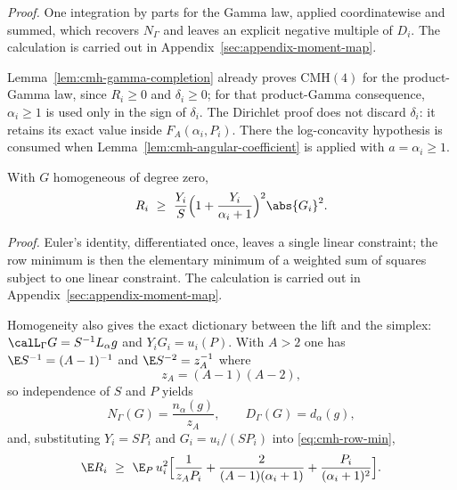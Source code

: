 \documentclass[../../main.tex]{subfiles}
\begin{document}
\noindent\emph{Proof.} One integration by parts for the Gamma law, applied coordinatewise and summed, which recovers $N_\Gamma$ and leaves an explicit negative multiple of $D_i$. The calculation is carried out in Appendix~\ref{sec:appendix-moment-map}.

\begin{remark}
\label{rem:cmh-dirichlet-logconcavity}
Lemma~\ref{lem:cmh-gamma-completion} already proves $\mathrm{CMH}(4)$ for the product-Gamma law,
since $R_i\ge0$ and $\delta_i\ge0$; for that product-Gamma consequence, $\alpha_i\ge1$ is used
only in the sign of $\delta_i$. The Dirichlet proof does not discard $\delta_i$: it retains its
exact value inside $F_A(\alpha_i,P_i)$. There the log-concavity hypothesis is consumed when
Lemma~\ref{lem:cmh-angular-coefficient} is applied with $a=\alpha_i\ge1$.
\end{remark}

\begin{lemma}
\label{lem:cmh-row-min}
With $G$ homogeneous of degree zero,
\begin{equation}
  R_i\ \ge\ \frac{Y_i}S\Bigl(1+\frac{Y_i}{\alpha_i+1}\Bigr)^2\abs{G_i}^2 .
  \label{eq:cmh-row-min}
\end{equation}
\end{lemma}

\noindent\emph{Proof.} Euler's identity, differentiated once, leaves a single linear constraint; the row minimum is then the elementary minimum of a weighted sum of squares subject to one linear constraint. The calculation is carried out in Appendix~\ref{sec:appendix-moment-map}.

Homogeneity also gives the exact dictionary between the lift and the simplex:
$\calL_\Gamma G=S^{-1}L_\alpha g$ and $Y_iG_i=u_i(P)$. With $A>2$ one has $\E S^{-1}=(A-1)^{-1}$
and $\E S^{-2}=z_A^{-1}$ where
\begin{equation}
  z_A=(A-1)(A-2),
  \label{eq:cmh-zA}
\end{equation}
so independence of $S$ and $P$ yields
\begin{equation}
  N_\Gamma(G)=\frac{n_\alpha(g)}{z_A},
  \qquad
  D_\Gamma(G)=d_\alpha(g),
  \label{eq:cmh-radial-relations}
\end{equation}
and, substituting $Y_i=SP_i$ and $G_i=u_i/(SP_i)$ into \eqref{eq:cmh-row-min},
\begin{equation}
  \E R_i\ \ge\ \E_P\,u_i^2
  \Bigl[\frac1{z_AP_i}+\frac2{(A-1)(\alpha_i+1)}+\frac{P_i}{(\alpha_i+1)^2}\Bigr].
  \label{eq:cmh-integrated-row}
\end{equation}
\end{document}
